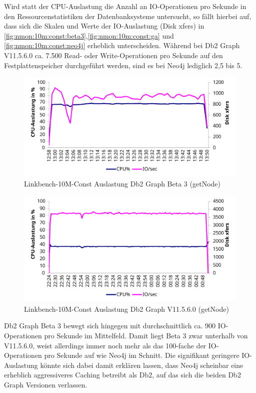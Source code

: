 Wird statt der CPU-Auslastung die Anzahl an IO-Ope\-ra\-ti\-on\-en pro Sekunde in den Ressourcenstatistiken der Datenbanksysteme untersucht, so fällt hierbei auf, dass sich die Skalen und Werte der IO-Aus\-last\-ung (Disk xfers) in \autoref{fig:nmon:10m:const:beta3},\autoref{fig:nmon:10m:const:ga} und \autoref{fig:nmon:10m:const:neo4j} erheblich unterscheiden. Während bei Db2 Graph V11.5.6.0 ca. 7.500 Read- oder Write-Ope\-ra\-ti\-on\-en pro Sekunde auf den Festplattenspeicher durchgeführt werden, sind es bei Neo4j lediglich 2,5 bis 5. 
\begin{figure}[!ht]
    \centering
    \includegraphics[width=\textwidth]{images/stats/linkbench-10m-const_beta3.pdf}
    \caption{Linkbench-10M-Const Auslastung Db2 Graph Beta 3 (getNode)}
    \label{fig:nmon:10m:const:beta3}
\end{figure}

\begin{figure}[!ht]
    \centering
    \includegraphics[width=\textwidth]{images/stats/linkbench-10m-const_ga.pdf}
    \caption{Linkbench-10M-Const Auslastung Db2 Graph V11.5.6.0 (getNode)}
    \label{fig:nmon:10m:const:ga}
\end{figure}

Db2 Graph Beta 3 bewegt sich hingegen mit durchschnittlich ca. 900 IO-Ope\-ra\-ti\-on\-en pro Sekunde im Mittelfeld. Damit liegt Beta 3 zwar unterhalb von V11.5.6.0, weist allerdings immer noch mehr als das 100-fache der IO-Ope\-ra\-ti\-on\-en pro Sekunde auf wie Neo4j im Schnitt. Die signifikant geringere IO-Aus\-last\-ung könnte sich dabei damit erklären lassen, dass Neo4j scheinbar eine erheblich aggressiveres Caching betreibt als Db2, auf das sich die beiden Db2 Graph Versionen verlassen. 

